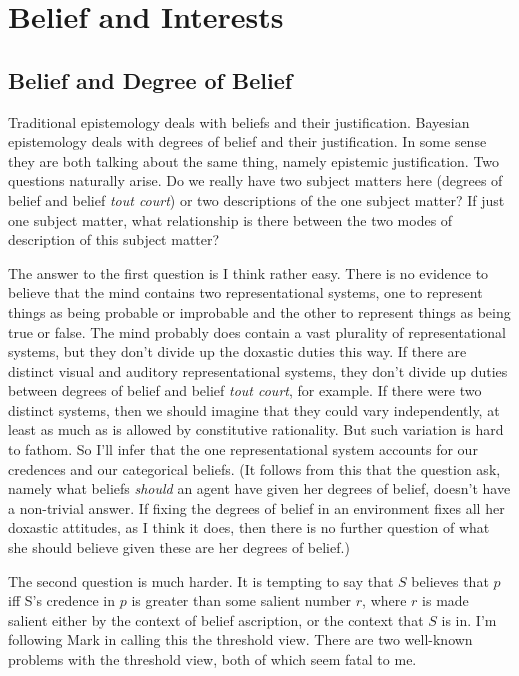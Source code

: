 \chapter{Belief and Interests}

\section{Belief and Degree of Belief}

Traditional epistemology deals with beliefs and their justification. Bayesian epistemology deals with degrees of belief and their justification. In some sense they are both talking about the same thing, namely epistemic justification. Two questions naturally arise. Do we really have two subject matters here (degrees of belief and belief \textit{tout court}) or two descriptions of the one subject matter? If just one subject matter, what relationship is there between the two modes of description of this subject matter?

The answer to the first question is I think rather easy. There is no evidence to believe that the mind contains two representational systems, one to represent things as being probable or improbable and the other to represent things as being true or false. The mind probably does contain a vast plurality of representational systems, but they don't divide up the doxastic duties this way. If there are distinct visual and auditory representational systems, they don't divide up duties between degrees of belief and belief \textit{tout court}, for example. If there were two distinct systems, then we should imagine that they could vary independently, at least as much as is allowed by constitutive rationality. But such variation is hard to fathom. So I'll infer that the one representational system accounts for our credences and our categorical beliefs. (It follows from this that the question \cite{Bovens1999} ask, namely what beliefs \textit{should} an agent have given her degrees of belief, doesn't have a non-trivial answer. If fixing the degrees of belief in an environment fixes all her doxastic attitudes, as I think it does, then there is no further question of what she should believe given these are her degrees of belief.) 

The second question is much harder. It is tempting to say that \(S\) believes that \(p\) iff S's credence in \(p\) is greater than some salient number \(r\), where \(r\) is made salient either by the context of belief ascription, or the context that \(S\) is in. I'm following Mark \cite{Kaplan1996} in calling this the threshold view. There are two well-known problems with the threshold view, both of which seem fatal to me.

